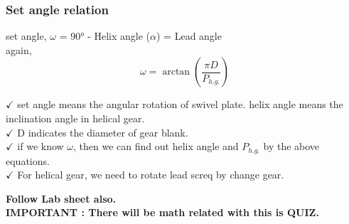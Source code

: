 \documentclass{article}
\begin{document}
\begin{multicols}{2}
\subsubsection*{Set angle relation}
set angle, $\omega$ = 90° - Helix angle ($\alpha$) = Lead angle \\
again, $$\omega = \arctan \left(\frac{\pi D}{P_{h.g.}}\right)$$

$\checkmark$ set angle means the angular rotation of swivel plate. helix angle means the inclination angle in helical gear.\\
$\checkmark$ D indicates the diameter of gear blank.\\
$\checkmark$ if we know $\omega$, then we can find out helix angle and $P_{h.g.}$ by the above equations.\\
$\checkmark$ For helical gear, we need to rotate lead screq by change gear. \\
\end{multicols}
\textbf{Follow Lab sheet also.}\\
\textbf{IMPORTANT : There will be math related with this is QUIZ.}
\hrulefill
\end{document}
